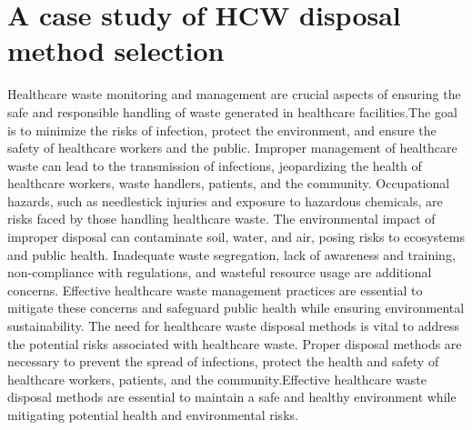 \chapter{A case study of HCW disposal method selection}
\begin{flushleft}
Healthcare waste monitoring and management are crucial aspects of ensuring the safe and responsible handling of waste generated in healthcare facilities.The goal is to minimize the risks of infection, protect the environment, and ensure the safety of healthcare workers and the public. Improper management of healthcare waste can lead to the transmission of infections, jeopardizing the health of healthcare workers, waste handlers, patients, and the community. Occupational hazards, such as needlestick injuries and exposure to hazardous chemicals, are risks faced by those handling healthcare waste. The environmental impact of improper disposal can contaminate soil, water, and air, posing risks to ecosystems and public health. Inadequate waste segregation, lack of awareness and training, non-compliance with regulations, and wasteful resource usage are additional concerns. Effective healthcare waste management practices are essential to mitigate these concerns and safeguard public health while ensuring environmental sustainability.
\newline
\vspace{0.5cm}
The need for healthcare waste disposal methods is vital to address the potential risks associated with healthcare waste. Proper disposal methods are necessary to prevent the spread of infections, protect the health and safety of healthcare workers, patients, and the community.Effective healthcare waste disposal methods are essential to maintain a safe and healthy environment while mitigating potential health and environmental risks.

\end{flushleft}
